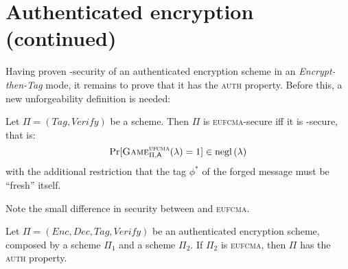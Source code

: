 
\section{Authenticated encryption (continued)}

Having proven \cpa-security of an authenticated encryption scheme in an \emph{Encrypt-then-Tag} mode, it remains to prove that it has the \textsc{auth} property. Before this, a new unforgeability definition is needed:

\begin{definition}
    Let $\Pi = (\textit{Tag}, \textit{Verify})$ be a \mac{} scheme. Then $\Pi$ is \textsc{eufcma}-secure iff it is \ufcma-secure, that is:
    \[
        \Pr[\cryptog{ufcma}(\lambda) = 1] \in \negl{\lambda}
    \]
    with the additional restriction that the tag $\phi^*$ of the forged message must be ``fresh'' itself.
\end{definition}

Note the small difference in security between \ufcma{} and \textsc{eufcma}.

\begin{theorem}
    Let $\Pi = (Enc, Dec, Tag, Verify)$ be an authenticated encryption scheme, composed by a \ske{} scheme $\Pi_1$ and a \mac{} scheme $\Pi_2$. If $\Pi_2$ is \textsc{eufcma}, then $\Pi$ has the \textsc{auth} property.
\end{theorem}

